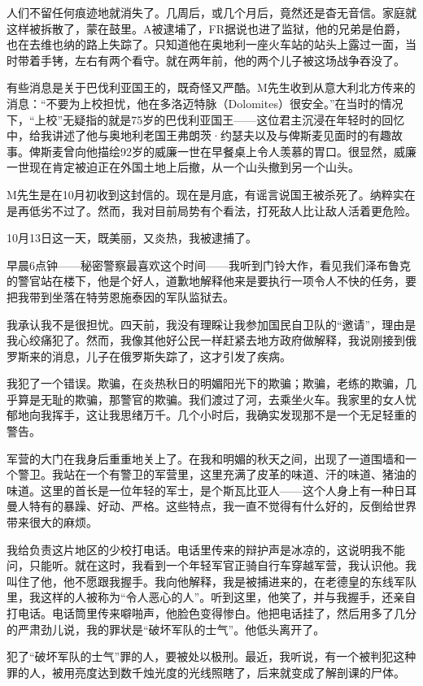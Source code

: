 \documentclass[UTF8]{ctexart}
\begin{document}
人们不留任何痕迹地就消失了。几周后，或几个月后，竟然还是杳无音信。家庭就这样被拆散了，蒙在鼓里。A被逮埔了，FR据说也进了监狱，他的兄弟是伯爵，也在去维也纳的路上失踪了。只知道他在奥地利一座火车站的站头上露过一面，当时带着手铐，左右有两个看守。就在两年前，他的两个儿子被这场战争吞没了。

有些消息是关于巴伐利亚国王的，既奇怪又严酷。M先生收到从意大利北方传来的消息：“不要为上校担忧，他在多洛迈特脉（Dolomites）很安全。”在当时的情况下，“上校”无疑指的就是75岁的巴伐利亚国王——这位君主沉浸在年轻时的回忆中，给我讲述了他与奥地利老国王弗朗茨·约瑟夫以及与俾斯麦见面时的有趣故事。俾斯麦曾向他描绘92岁的威廉一世在早餐桌上令人羡慕的胃口。很显然，威廉一世现在肯定被迫正在外国土地上后撤，从一个山头撤到另一个山头。

M先生是在10月初收到这封信的。现在是月底，有谣言说国王被杀死了。纳粹实在是再低劣不过了。然而，我对目前局势有个看法，打死敌人比让敌人活着更危险。

10月13日这一天，既美丽，又炎热，我被逮捕了。

早晨6点钟——秘密警察最喜欢这个时间——我听到门铃大作，看见我们泽布鲁克的警官站在楼下，他是个好人，道歉地解释他来是要执行一项令人不快的任务，要把我带到坐落在特劳恩施泰因的军队监狱去。

我承认我不是很担忧。四天前，我没有理睬让我参加国民自卫队的“邀请”，理由是我心绞痛犯了。然而，我像其他好公民一样赶紧去地方政府做解释，我说刚接到俄罗斯来的消息，儿子在俄罗斯失踪了，这才引发了疾病。

我犯了一个错误。欺骗，在炎热秋日的明媚阳光下的欺骗；欺骗，老练的欺骗，几乎算是无耻的欺骗，那警官的欺骗。我们渡过了河，去乘坐火车。我家里的女人忧郁地向我挥手，这让我思绪万千。几个小时后，我确实发现那不是一个无足轻重的警告。

军营的大门在我身后重重地关上了。在我和明媚的秋天之间，出现了一道围墙和一个警卫。我站在一个有警卫的军营里，这里充满了皮革的味道、汗的味道、猪油的味道。这里的首长是一位年轻的军士，是个斯瓦比亚人——这个人身上有一种日耳曼人特有的暴躁、好动、严格。这些特点，我一直不觉得有什么好的，反倒给世界带来很大的麻烦。

我给负责这片地区的少校打电话。电话里传来的辩护声是冰凉的，这说明我不能问，只能听。就在这时，我看到一个年轻军官正骑自行车穿越军营，我认识他。我叫住了他，他不愿跟我握手。我向他解释，我是被捕进来的，在老德皇的东线军队里，我这样的人被称为“令人恶心的人”。听到这里，他笑了，并与我握手，还亲自打电话。电话筒里传来噼啪声，他脸色变得惨白。他把电话挂了，然后用多了几分的严肃劲儿说，我的罪状是“破坏军队的士气”。他低头离开了。

犯了“破坏军队的士气”罪的人，要被处以极刑。最近，我听说，有一个被判犯这种罪的人，被用亮度达到数千烛光度的光线照瞎了，后来就变成了解剖课的尸体。
\end{document}
